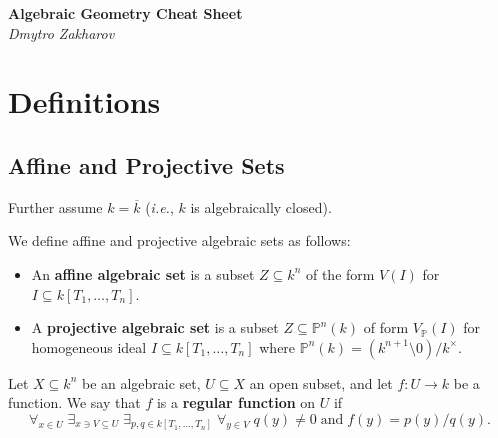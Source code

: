 \documentclass{template}
\begin{document}
\begin{center}
    \Large \textcolor{blue!70!black}{\textbf{Algebraic Geometry Cheat Sheet}} \\
    \normalsize \textit{Dmytro Zakharov}
\end{center}

\tableofcontents

\newpage

\section{Definitions}

\subsection{Affine and Projective Sets}

Further assume $k = \overline{k}$ (\textit{i.e.}, $k$ is algebraically closed).

\begin{definition}
    We define affine and projective algebraic sets as follows:
    \begin{itemize}
        \item An \textbf{affine algebraic set} is a subset $Z \subseteq k^n$ of 
    the form $V(I)$ for $I \subseteq k[T_1,\dots,T_n]$.
        \item A \textbf{projective algebraic set} is a subset $Z \subseteq \mathbb{P}^n(k)$
    of form $V_{\mathbb{P}}(I)$ for homogeneous ideal $I \subseteq k[T_1,\dots,T_n]$ where 
    $\mathbb{P}^n(k) = (k^{n+1}\setminus 0)/k^{\times}$.
    \end{itemize}
\end{definition}

\begin{definition}
    Let $X \subseteq k^n$ be an algebraic set, $U \subseteq X$ an open subset,
    and let $f: U \to k$ be a function. We say that $f$ is a \textbf{regular function}
    on $U$ if
    \begin{equation*}
        \forall_{x \in U} \; \exists_{x \ni V \subseteq U} \; \exists_{p,q \in k[T_1,\dots,T_n]} \; \forall_{y \in V} \; q(y) \neq 0 \; \text{and} \; f(y) = p(y)/q(y).
    \end{equation*}
\end{definition}
\end{document}
